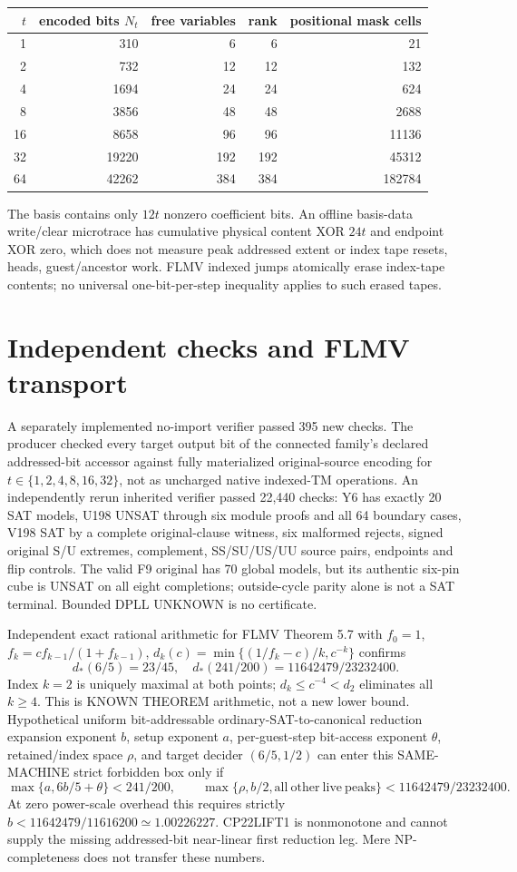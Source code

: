 \documentclass[11pt]{article}
\begin{document}
\begin{center}\begin{tabular}{rrrrr}\toprule
$t$ & encoded bits $N_t$ & free variables & rank & positional mask cells\\\midrule
1&310&6&6&21\\2&732&12&12&132\\4&1694&24&24&624\\8&3856&48&48&2688\\16&8658&96&96&11136\\32&19220&192&192&45312\\64&42262&384&384&182784\\\bottomrule
\end{tabular}\end{center}
The basis contains only $12t$ nonzero coefficient bits. An offline basis-data write/clear microtrace has cumulative physical content XOR $24t$ and endpoint XOR zero, which does not measure peak addressed extent or index tape resets, heads, guest/ancestor work. FLMV indexed jumps atomically erase index-tape contents; no universal one-bit-per-step inequality applies to such erased tapes.

\section{Independent checks and FLMV transport}
A separately implemented no-import verifier passed 395 new checks. The producer checked every target output bit of the connected family's declared addressed-bit accessor against fully materialized original-source encoding for $t\in\{1,2,4,8,16,32\}$, not as uncharged native indexed-TM operations. An independently rerun inherited verifier passed 22,440 checks: Y6 has exactly 20 SAT models, U198 UNSAT through six module proofs and all 64 boundary cases, V198 SAT by a complete original-clause witness, six malformed rejects, signed original S/U extremes, complement, SS/SU/US/UU source pairs, endpoints and flip controls. The valid F9 original has 70 global models, but its authentic six-pin cube is UNSAT on all eight completions; outside-cycle parity alone is not a SAT terminal. Bounded DPLL UNKNOWN is no certificate.

Independent exact rational arithmetic for FLMV Theorem 5.7 with $f_0=1$, $f_k=cf_{k-1}/(1+f_{k-1})$, $d_k(c)=\min\{(1/f_k-c)/k,c^{-k}\}$ confirms
\[
d_*(6/5)=23/45,\quad
d_*(241/200)=11642479/23232400.
\]
Index $k=2$ is uniquely maximal at both points; $d_k\le c^{-4}<d_2$ eliminates all $k\ge4$. This is KNOWN THEOREM arithmetic, not a new lower bound. Hypothetical uniform bit-addressable ordinary-SAT-to-canonical reduction expansion exponent $b$, setup exponent $a$, per-guest-step bit-access exponent $\theta$, retained/index space $\rho$, and target decider $(6/5,1/2)$ can enter this SAME-MACHINE strict forbidden box only if
\[
\max\{a,6b/5+\theta\}<241/200,\qquad
\max\{\rho,b/2,\mathrm{all\ other\ live\ peaks}\}<11642479/23232400.
\]
At zero power-scale overhead this requires strictly $b<11642479/11616200\simeq1.00226227$. CP22LIFT1 is nonmonotone and cannot supply the missing addressed-bit near-linear first reduction leg. Mere NP-completeness does not transfer these numbers.
\end{document}
